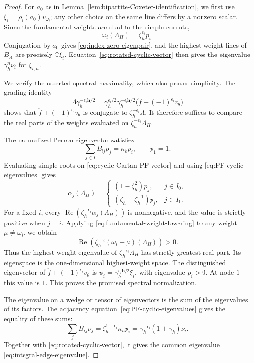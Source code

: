 \documentclass[11pt,leqno]{amsart}
\numberwithin{equation}{section}
\theoremstyle{plain}
\theoremstyle{definition}
\theoremstyle{plain}
\theoremstyle{definition}
\theoremstyle{remark}
\begin{document}
\begin{proof}
For $a_0$ as in Lemma~\ref{lem:bipartite-Coxeter-identification}, we first use $\xi_i=\rho_i(a_0)v_{\omega_i}$; any other choice on the same line differs by a nonzero scalar.  Since the fundamental weights are dual to the simple coroots,
\[
 \omega_i(\Lambda_H)=\zeta_h^{\epsilon_i}p_i.
\]
Conjugation by $a_0$ gives \eqref{eq:index-zero-eigenpair}, and the highest-weight lines of $B_\Lambda$ are precisely $\mathbb C\xi_i$.  Equation~\eqref{eq:rotated-cyclic-vector} then gives the eigenvalue $\gamma_h^n\nu_i$ for $\xi_{i,n}$.

We verify the asserted spectral maximality, which also proves simplicity.  The grading identity
\[
 \Lambda\gamma_h^{-\epsilon_i\mathbf h/2}
 =\gamma_h^{\epsilon_i/2}\gamma_h^{-\epsilon_i\mathbf h/2}
   \bigl(\mathring f+(-1)^{\epsilon_i}v_\theta\bigr)
\]
shows that $\mathring f+(-1)^{\epsilon_i}v_\theta$ is conjugate to $\zeta_h^{-\epsilon_i}\Lambda$.  It therefore suffices to compare the real parts of the weights evaluated on $\zeta_h^{-\epsilon_i}\Lambda_H$.

The normalized Perron eigenvector satisfies
\begin{equation}\label{eq:PF-cyclic-eigenvalues}
 \sum_{j\in I}B_{ij}p_j=\kappa_hp_i,
 \qquad p_1=1.
\end{equation}
Evaluating simple roots on \eqref{eq:cyclic-Cartan-PF-vector} and using \eqref{eq:PF-cyclic-eigenvalues} gives
\[
 \alpha_j(\Lambda_H)=
 \begin{cases}
 (1-\zeta_h^2)p_j,&j\in I_0,\\
 (\zeta_h-\zeta_h^{-1})p_j,&j\in I_1.
 \end{cases}
\]
For a fixed $i$, every $\operatorname{Re}(\zeta_h^{-\epsilon_i}\alpha_j(\Lambda_H))$ is nonnegative, and the value is strictly positive when $j=i$.  Applying \eqref{eq:fundamental-weight-lowering} to any weight $\mu\ne\omega_i$, we obtain
\[
 \operatorname{Re}\!\left(
 \zeta_h^{-\epsilon_i}(\omega_i-\mu)(\Lambda_H)\right)>0.
\]
Thus the highest-weight eigenvalue of $\zeta_h^{-\epsilon_i}\Lambda_H$ has strictly greatest real part.  Its eigenspace is the one-dimensional highest-weight space.  The distinguished eigenvector of $\mathring f+(-1)^{\epsilon_i}v_\theta$ is $\psi_i=\gamma_h^{\epsilon_i\mathbf h/2}\xi_i$, with eigenvalue $p_i>0$.  At node $1$ this value is $1$.  This proves the promised spectral normalization.

The eigenvalue on a wedge or tensor of eigenvectors is the sum of the eigenvalues of its factors.  The adjacency equation~\eqref{eq:PF-cyclic-eigenvalues} gives the equality of these sums:
\[
 \sum_j B_{ij}\nu_j
 =\zeta_h^{1-\epsilon_i}\kappa_hp_i
 =\gamma_h^{-\epsilon_i}(1+\gamma_h)\nu_i.
\]
Together with \eqref{eq:rotated-cyclic-vector}, it gives the common eigenvalue \eqref{eq:integral-edge-eigenvalue}.


\end{proof}
\end{document}

